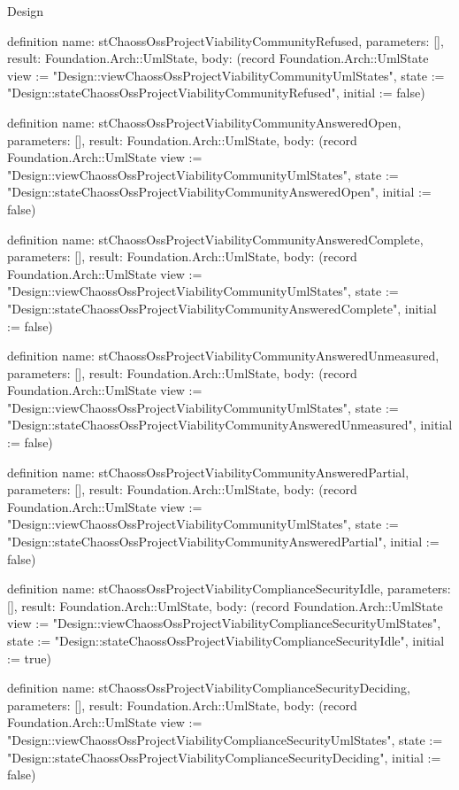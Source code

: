 \begin{lexlean}{Design}
\begin{semanticmodule}
definition{
  name: stChaossOssProjectViabilityCommunityRefused,
  parameters: [],
  result: Foundation.Arch::UmlState,
  body: (record Foundation.Arch::UmlState {view := "Design::viewChaossOssProjectViabilityCommunityUmlStates", state := "Design::stateChaossOssProjectViabilityCommunityRefused", initial := false})
}

definition{
  name: stChaossOssProjectViabilityCommunityAnsweredOpen,
  parameters: [],
  result: Foundation.Arch::UmlState,
  body: (record Foundation.Arch::UmlState {view := "Design::viewChaossOssProjectViabilityCommunityUmlStates", state := "Design::stateChaossOssProjectViabilityCommunityAnsweredOpen", initial := false})
}

definition{
  name: stChaossOssProjectViabilityCommunityAnsweredComplete,
  parameters: [],
  result: Foundation.Arch::UmlState,
  body: (record Foundation.Arch::UmlState {view := "Design::viewChaossOssProjectViabilityCommunityUmlStates", state := "Design::stateChaossOssProjectViabilityCommunityAnsweredComplete", initial := false})
}

definition{
  name: stChaossOssProjectViabilityCommunityAnsweredUnmeasured,
  parameters: [],
  result: Foundation.Arch::UmlState,
  body: (record Foundation.Arch::UmlState {view := "Design::viewChaossOssProjectViabilityCommunityUmlStates", state := "Design::stateChaossOssProjectViabilityCommunityAnsweredUnmeasured", initial := false})
}

definition{
  name: stChaossOssProjectViabilityCommunityAnsweredPartial,
  parameters: [],
  result: Foundation.Arch::UmlState,
  body: (record Foundation.Arch::UmlState {view := "Design::viewChaossOssProjectViabilityCommunityUmlStates", state := "Design::stateChaossOssProjectViabilityCommunityAnsweredPartial", initial := false})
}

definition{
  name: stChaossOssProjectViabilityComplianceSecurityIdle,
  parameters: [],
  result: Foundation.Arch::UmlState,
  body: (record Foundation.Arch::UmlState {view := "Design::viewChaossOssProjectViabilityComplianceSecurityUmlStates", state := "Design::stateChaossOssProjectViabilityComplianceSecurityIdle", initial := true})
}

definition{
  name: stChaossOssProjectViabilityComplianceSecurityDeciding,
  parameters: [],
  result: Foundation.Arch::UmlState,
  body: (record Foundation.Arch::UmlState {view := "Design::viewChaossOssProjectViabilityComplianceSecurityUmlStates", state := "Design::stateChaossOssProjectViabilityComplianceSecurityDeciding", initial := false})
}


\end{semanticmodule}
\end{lexlean}
